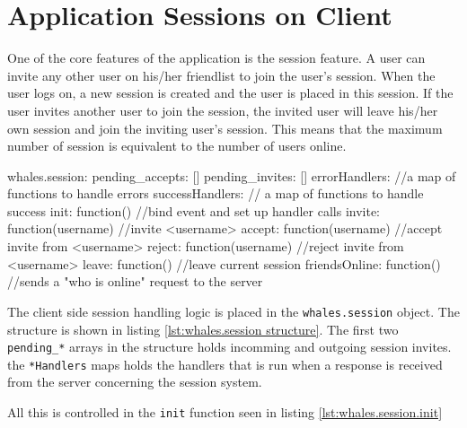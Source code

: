 \section{Application Sessions on Client}
One of the core features of the application is the session feature. A user can
invite any other user on his/her friendlist to join the user's session. When the
user logs on, a new session is created and the user is placed in this session.
If the user invites another user to join the session, the invited user will
leave his/her own session and join the inviting user's session. This means that
the maximum number of session is equivalent to the number of users online.

\begin{snippet}[language=JavaScript,label=lst:whales.session structure,caption=The whales.session structure]
whales.session: {
    pending_accepts: []
    pending_invites: []
    errorHandlers: {} //a map of functions to handle errors
    successHandlers: {} // a map of functions to handle success
    init: function() //bind event and set up handler calls
    invite: function(username) //invite <username>
    accept: function(username) //accept invite from <username>
    reject: function(username) //reject invite from <username>
    leave: function() //leave current session
    friendsOnline: function() //sends a "who is online" request to the server
}
\end{snippet}

The client side session handling logic is placed in the
\lstinline$whales.session$ object. The structure is shown in listing \ref{lst:whales.session structure}.
The first two \verb$pending_*$ arrays in the structure holds incomming and
outgoing session invites. the \verb$*Handlers$ maps holds the handlers that is
run when a response is received from the server concerning the session system.


All this is controlled in the \verb$init$ function seen in listing \ref{lst:whales.session.init}


